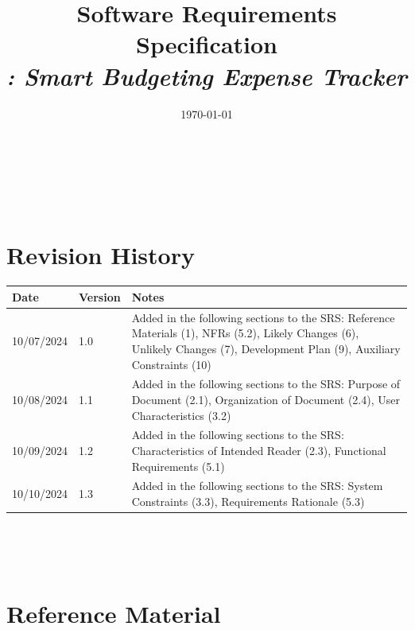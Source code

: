 \documentclass[12pt]{article}
\begin{document}
\title{Software Requirements Specification \\ \textit{\progname: Smart Budgeting Expense Tracker}} 
\author{\authname}
\date{\today}
	
\maketitle

~\newpage


\tableofcontents

~\newpage

\section*{Revision History}

\begin{tabularx}{\textwidth}{p{3cm}p{2cm}X}
\toprule {\bf Date} & {\bf Version} & {\bf Notes}\\
\midrule
10/07/2024 & 1.0 & Added in the following sections to the SRS: Reference Materials (1), NFRs (5.2), Likely Changes (6), Unlikely Changes (7), Development Plan (9), Auxiliary Constraints (10)\\
10/08/2024 & 1.1 & Added in the following sections to the SRS: Purpose of Document (2.1), Organization of Document (2.4), User Characteristics (3.2)\\
10/09/2024 & 1.2 & Added in the following sections to the SRS: Characteristics of Intended Reader (2.3), Functional Requirements (5.1)\\
10/10/2024 & 1.3 & Added in the following sections to the SRS: System Constraints (3.3), Requirements Rationale (5.3)\\
\bottomrule 
\end{tabularx}

~\\

~\newpage

\section{Reference Material}
\end{document}
